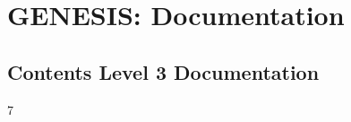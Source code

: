 \documentclass[12pt]{article}
\begin{document}
\section*{GENESIS: Documentation}

\subsection*{Contents Level 3 Documentation}

\begin{itemize}

7
\end{itemize}

\end{document}
